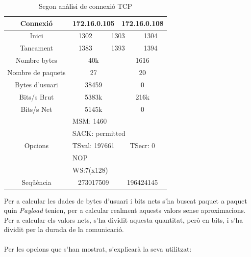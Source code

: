 \documentclass{article}
\begin{document}
\begin{table}[!h]
\centering
\begin{tabular}{c|cccccc}
Connexió &\multicolumn{3}{c}{172.16.0.105} &\multicolumn{3}{c}{172.16.0.108}\\
\hline
Inici &\multicolumn{2}{c}{1302} &\multicolumn{2}{c}{1303} &\multicolumn{2}{c}{1304}\\
\hline
Tancament &\multicolumn{2}{c}{1383} &\multicolumn{2}{c}{1393} 
&\multicolumn{2}{c}{1394}\\
\hline
Nombre bytes &\multicolumn{3}{c}{40k} &\multicolumn{3}{c}{1616}\\
\hline
Nombre de paquets &\multicolumn{3}{c}{27} &\multicolumn{3}{c}{20}\\
\hline
Bytes d'usuari &\multicolumn{3}{c}{38459} &\multicolumn{3}{c}{0}\\
\hline
Bits/s Brut &\multicolumn{3}{c}{5383k} &\multicolumn{3}{c}{216k}\\
\hline
Bits/s Net &\multicolumn{3}{c}{5145k} &\multicolumn{3}{c}{0}\\
\hline
\multirow{5}{*}{Opcions} &\multicolumn{6}{l}{MSM: 1460} \\
&\multicolumn{6}{l}{SACK: permitted}\\
&\multicolumn{3}{c}{TSval: 197661} 
&\multicolumn{3}{c}{TSecr: 0}\\
&\multicolumn{6}{l}{NOP}\\
&\multicolumn{6}{l}{WS:7(x128)}\\
\hline
Seqüència &\multicolumn{3}{c}{273017509} &\multicolumn{3}{c}{196424145}\\
\end{tabular}
\caption{Segon anàlisi de connexió TCP}
\label{ana:snd}
\end{table}
Per a calcular les dades de bytes d'usuari i bits nets s'ha buscat paquet
a paquet quin \textit{Payload} tenien, per a calcular realment aquests valors
sense aproximacions. Per a calcular els valors nets, s'ha dividit aquesta quantitat,
però en bits, i s'ha dividit per la durada de la comunicació.\\
\\
Per les opcions que s'han mostrat, s'explicarà la seva utilitzat:
\end{document}
